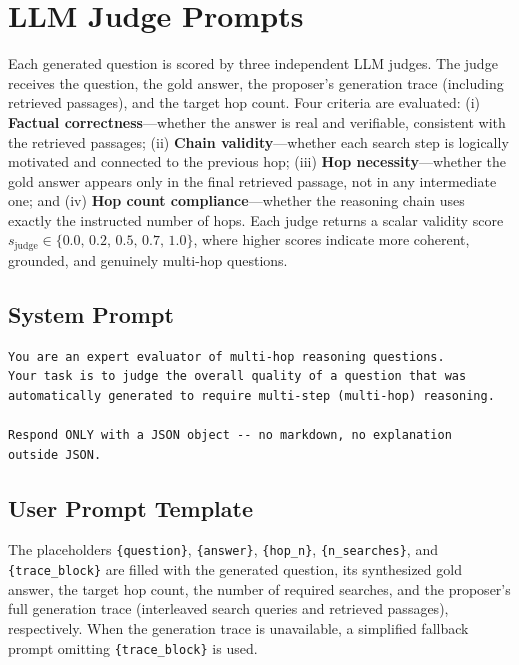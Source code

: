 \documentclass{article}
\begin{document}
\section{LLM Judge Prompts}
\label{app:judge_prompts}

Each generated question is scored by three independent LLM judges.
The judge receives the question, the gold answer, the proposer's generation trace (including retrieved passages), and the target hop count.
Four criteria are evaluated: (i) \textbf{Factual correctness}---whether the answer is real and verifiable, consistent with the retrieved passages; (ii) \textbf{Chain validity}---whether each search step is logically motivated and connected to the previous hop; (iii) \textbf{Hop necessity}---whether the gold answer appears only in the final retrieved passage, not in any intermediate one; and (iv) \textbf{Hop count compliance}---whether the reasoning chain uses exactly the instructed number of hops.
Each judge returns a scalar validity score $s_{\mathrm{judge}} \in \{0.0,\, 0.2,\, 0.5,\, 0.7,\, 1.0\}$, where higher scores indicate more coherent, grounded, and genuinely multi-hop questions.

\subsection{System Prompt}

\begin{tcolorbox}[judgebox, title={LLM Judge System Prompt}, breakable]
\small
\begin{verbatim}
You are an expert evaluator of multi-hop reasoning questions.
Your task is to judge the overall quality of a question that was
automatically generated to require multi-step (multi-hop) reasoning.

Respond ONLY with a JSON object -- no markdown, no explanation
outside JSON.
\end{verbatim}
\end{tcolorbox}

\subsection{User Prompt Template}

The placeholders \texttt{\{question\}}, \texttt{\{answer\}}, \texttt{\{hop\_n\}},
\texttt{\{n\_searches\}}, and \texttt{\{trace\_block\}} are filled with the
generated question, its synthesized gold answer, the target hop count, the
number of required searches, and the proposer's full generation trace
(interleaved search queries and retrieved passages), respectively.
When the generation trace is unavailable, a simplified fallback prompt
omitting \texttt{\{trace\_block\}} is used.
\end{document}

